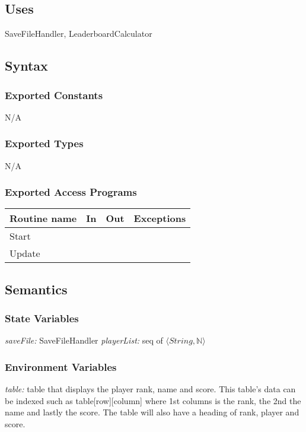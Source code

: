 \documentclass[12pt]{article}
\begin{document}
\subsection {Uses}
SaveFileHandler, LeaderboardCalculator

\subsection {Syntax}

\subsubsection {Exported Constants}
N/A
\subsubsection {Exported Types}
N/A
\subsubsection {Exported Access Programs}

\begin{tabular}{| l | l | l | l |}
\hline
\textbf{Routine name} & \textbf{In} & \textbf{Out} & \textbf{Exceptions}\\
\hline
Start    &      &           &          \\
\hline
Update   &      &           &          \\
\hline
\end{tabular}

\subsection {Semantics}

\subsubsection {State Variables}
\textit{saveFile:} SaveFileHandler
\textit{playerList:} seq of $\langle String, \mathbb{N} \rangle$

\subsubsection {Environment Variables}
\textit{table:} table that displays the player rank,  name and score. This table's data can be indexed such as table[row][column] where 1st columns is the rank, the 2nd the name and lastly the score. The table will also have a heading of rank, player and score.
\end{document}
